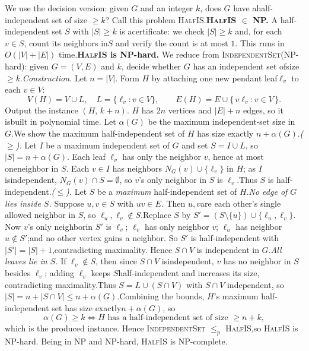 \documentclass[12pt]{article}
\begin{document}
\begin{solution}
    \bbni
    
    We use the decision version: given $G$ and an integer $k$, does $G$ have ahalf-independent set of size $\ge k$? Call this problem \textsc{HalfIS}.\textbf{\textsc{HalfIS} $\in$ NP.} A half-independent set $S$ with $|S|\ge k$ is acertificate: we check $|S| \ge k$ and, for each $v \in S$, count its neighbors in$S$ and verify the count is at most $1$. This runs in $O(|V|+|E|)$ time.\textbf{\textsc{HalfIS} is NP-hard.} We reduce from \textsc{IndependentSet}(NP-hard): given $G=(V,E)$ and $k$, decide whether $G$ has an independent set ofsize $\ge k$.\emph{Construction.} Let $n=|V|$. Form $H$ by attaching one new pendant leaf$\ell_v$ to each $v\in V$:\[  V(H)=V\cup L,\quad L=\{\ell_v:v\in V\},\qquad  E(H)=E\cup\{\,v\ell_v : v\in V\,\}.\]Output the instance $(H,\,k+n)$. $H$ has $2n$ vertices and $|E|+n$ edges, so it isbuilt in polynomial time. Let $\alpha(G)$ be the maximum independent-set size in $G$.We show the maximum half-independent set of $H$ has size exactly $n+\alpha(G)$.\emph{($\ge$).} Let $I$ be a maximum independent set of $G$ and set $S=I\cup L$, so$|S|=n+\alpha(G)$. Each leaf $\ell_v$ has only the neighbor $v$, hence at most oneneighbor in $S$. Each $v\in I$ has neighbors $N_G(v)\cup\{\ell_v\}$ in $H$; as $I$ isindependent, $N_G(v)\cap S=\emptyset$, so $v$'s only neighbor in $S$ is $\ell_v$.Thus $S$ is half-independent.\emph{($\le$).} Let $S$ be a \emph{maximum} half-independent set of $H$.\emph{No edge of $G$ lies inside $S$.} Suppose $u,v\in S$ with $uv\in E$. Then $u,v$are each other's single allowed neighbor in $S$, so $\ell_u,\ell_v\notin S$.Replace $S$ by $S'=(S\setminus\{u\})\cup\{\ell_u,\ell_v\}$. Now $v$'s only neighborin $S'$ is $\ell_v$; $\ell_v$ has only neighbor $v$; $\ell_u$ has neighbor $u\notin S'$;and no other vertex gains a neighbor. So $S'$ is half-independent with $|S'|=|S|+1$,contradicting maximality. Hence $S\cap V$ is independent in $G$.\emph{All leaves lie in $S$.} If $\ell_v\notin S$, then since $S\cap V$ isindependent, $v$ has no neighbor in $S$ besides $\ell_v$; adding $\ell_v$ keeps $S$half-independent and increases its size, contradicting maximality.Thus $S=L\cup(S\cap V)$ with $S\cap V$ independent, so $|S|=n+|S\cap V|\le n+\alpha(G)$.Combining the bounds, $H$'s maximum half-independent set has size exactly$n+\alpha(G)$, so\[  \alpha(G)\ge k \iff H \text{ has a half-independent set of size } \ge n+k,\]which is the produced instance. Hence \textsc{IndependentSet} $\le_p$ \textsc{HalfIS},so \textsc{HalfIS} is NP-hard.
    Being in NP and NP-hard, \textsc{HalfIS} is NP-complete. 
\end{solution}
\end{document}
